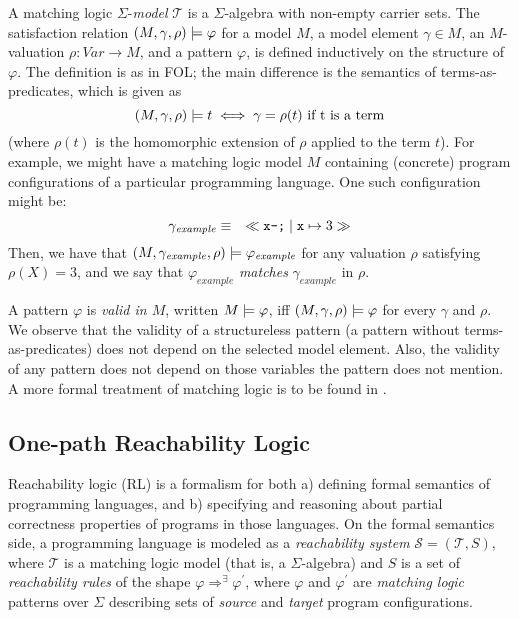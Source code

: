 A matching logic $\Sigma$-\emph{model} $\mathcal{T}$ is a $\Sigma$-algebra with non-empty carrier sets.
The satisfaction relation $(M, \gamma, \rho) \models \varphi$ for a model $M$, a model element $\gamma \in M$,
an $M$-valuation $\rho : \mathit{Var} \to M$, and a pattern $\varphi$, is defined inductively on the structure of $\varphi$.
The definition is as in FOL; the main difference is the semantics of
terms-as-predicates, which is given as
\begin{equation*}
    (M, \gamma, \rho) \models t \iff \gamma = \rho(t) \text{ if t is a term}
\end{equation*}
(where $\rho(t)$ is the homomorphic extension of $\rho$ applied to the term $t$).
For example, we might have a matching logic model $M$ containing (concrete) program configurations
of a particular programming language.
One such configuration might be:
\begin{equation*}
  \gamma_{\mathit{example}} \equiv\quad \ll\texttt{x--;}\mid \mathtt{x}\mapsto 3\gg
\end{equation*}
Then, we have that $(M, \gamma_{\mathit{example}}, \rho) \models \varphi_{\mathit{example}}$
for any valuation $\rho$ satisfying $\rho(X) = 3$, and we say that
$\varphi_{\mathit{example}}$ \emph{matches} $\gamma_{\mathit{example}}$ in $\rho$.


A pattern $\varphi$ is \emph{valid in $M$}, written $M \models \varphi$, iff $(M, \gamma, \rho) \models \varphi$
for every $\gamma$ and $\rho$.
We observe that the validity of a structureless pattern (a pattern without terms-as-predicates) does not depend on the selected model element.
Also, the validity of any pattern does not depend on those variables the pattern does not mention.
A more formal treatment of matching logic is to be found in .


\subsection{One-path Reachability Logic}
Reachability logic \cite{RosuS12oopsla, StefanescuCMMSR19} (RL) is a formalism for
both a) defining formal semantics of programming languages,
and b) specifying and reasoning about partial correctness properties
of programs in those languages.
On the formal semantics side, a programming language is modeled as a \emph{reachability system}
$\mathcal{S} = (\mathcal{T}, S)$, where $\mathcal{T}$ is a matching logic model (that is, a $\Sigma$-algebra)
and $S$ is a set of \emph{reachability rules} of the shape $\varphi \Rightarrow^\exists \varphi^\prime$,
where $\varphi$ and $\varphi^\prime$ are \emph{matching logic} patterns over $\Sigma$
describing sets of \emph{source} and \emph{target} program configurations.

